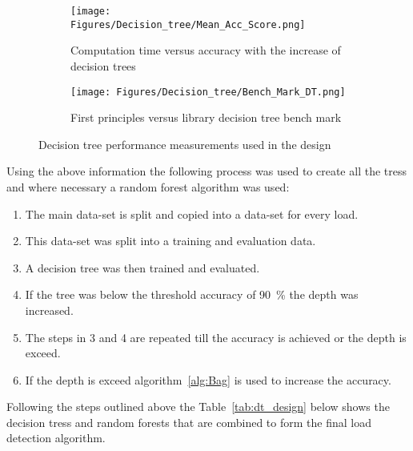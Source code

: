 \begin{figure}[H]
    \centering
    \begin{subfigure}[b]{0.495\textwidth}
        \centering
        \texttt{[image: Figures/Decision\_tree/Mean\_Acc\_Score.png]}
        \caption{Computation time versus accuracy with the increase of decision trees}
        \label{fig:DT_Performance}
    \end{subfigure}
    \hfill
    \begin{subfigure}[b]{0.495\textwidth}
        \centering
        \texttt{[image: Figures/Decision\_tree/Bench\_Mark\_DT.png]}
        \caption{First principles versus library decision tree bench mark}
        \label{fig:DT_Benchmark}
    \end{subfigure}
    \caption{Decision tree performance measurements used in the design}
    \label{fig:DT_Design_Bench}
\end{figure}

Using the above information the following process was used to create all the tress and where necessary a random forest algorithm was used:
\begin{enumerate}
    \item The main data-set is split and copied into a data-set for every load.
    \item This data-set was split into a training and evaluation data.
    \item A decision tree was then trained and evaluated.
    \item If the tree was below the threshold accuracy of \qty{90}{\percent} the depth was increased. 
    \item The steps in 3 and 4 are repeated till the accuracy is achieved or the depth is exceed.
    \item If the depth is exceed algorithm~\ref{alg:Bag} is used to increase the accuracy.
\end{enumerate}

\newpage
Following the steps outlined above the Table~\ref{tab:dt_design} below shows the decision tress and random forests that are combined to form the final load detection algorithm.

